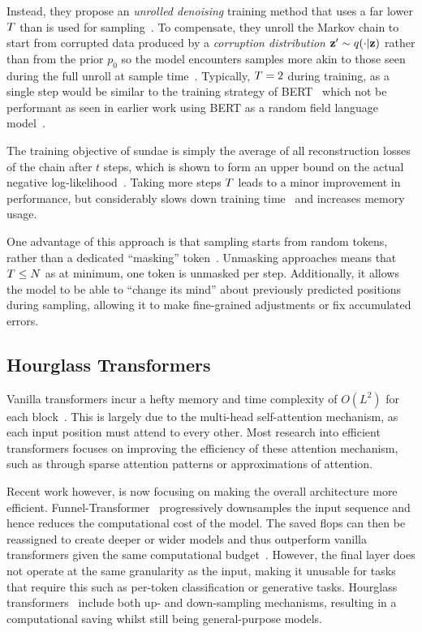 Instead, they propose an \textit{unrolled denoising} training method that uses a
far lower $T$ than is used for
sampling~\cite{savinov2022stepunrolled}. To compensate, they unroll the Markov
chain to start from corrupted data produced by a \textit{corruption
distribution} $\mathbf{z}' \sim q(\cdot \vert \mathbf{z})$
rather than from the prior $p_0$ so the model encounters samples more akin to
those seen during the full unroll at sample time~\cite{savinov2022stepunrolled}.
Typically, $T = 2$ during training, as a single step would be similar
to the training strategy of BERT~\cite{devlin2019bert} which not be performant
as seen in earlier work using BERT as a random field language
model~\cite{wang2019bert}.

The training objective of \gls{sundae} is simply the average of all
reconstruction losses of the chain after $t$ steps, which is shown to form an
upper bound on the actual negative
log-likelihood~\cite{savinov2022stepunrolled}. Taking more steps $T$
leads to a minor improvement in performance, but considerably slows down
training time~\cite{savinov2022stepunrolled} and increases memory usage.

One advantage of this approach is that sampling starts from random tokens,
rather than a dedicated ``masking''
token~\cite{bondtaylor2021unleashing,austin2021structured}. Unmasking approaches
means that $T \leq N$ as at minimum, one token is unmasked per step.
Additionally, it allows the model to be able to ``change its mind'' about
previously predicted positions during sampling, allowing it to make fine-grained
adjustments or fix accumulated errors.

\subsection{Hourglass Transformers}
\label{subsec:hourglass}

Vanilla transformers incur a hefty memory and time complexity of $O(L^2)$ for
each block~\cite{vaswani2017attention}. This is largely due to the multi-head
self-attention mechanism, as each input position must attend to every other.
Most research into efficient transformers focuses on improving the efficiency of
these attention mechanism, such as through sparse attention patterns or
approximations of attention.

Recent work however, is now focusing on making the overall architecture more
efficient. Funnel-Transformer~\cite{dai2020funneltransformer} progressively
downsamples the input sequence and hence reduces the computational cost of the
model. The saved \glspl{flop} can then be reassigned to create deeper or wider models
and thus outperform vanilla transformers given the same computational
budget~\cite{dai2020funneltransformer}. However, the final layer does not
operate at the same granularity as the input, making it unusable for tasks that
require this such as per-token classification or generative tasks. Hourglass
transformers~\cite{nawrot2021hierarchical} include both up- and down-sampling
mechanisms, resulting in a computational saving whilst still being
general-purpose models.

